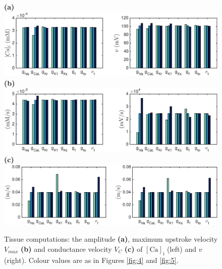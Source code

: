 \documentclass{article}
\begin{document}
\begin{figure}
 \textbf{(a)}  \includegraphics[trim=1cm 0cm 2cm 0cm, clip=true, width=1\linewidth]{amplitude} 
 \textbf{(b)}  \includegraphics[trim=1cm 0cm 2cm 0cm, clip=true, width=1\linewidth]{v_max} 
 \textbf{(c)}   \includegraphics[trim=1cm 0cm 2cm 0cm, clip=true, width=1\linewidth]{v_c} 
    \caption{Tissue computations: the amplitude \textbf{(a)}, maximum upstroke velocity $V_{max}$ \textbf{(b)} and conductance velocity $V_{C}$ \textbf{(c)} of $[\mathrm{Ca}]_{\mathrm{i}}$ (left) and $v$ (right).  Colour values are as in Figures \ref{fig:4} and \ref{fig:5}.}
    \label{fig:6}
\end{figure}
%
\end{document}
